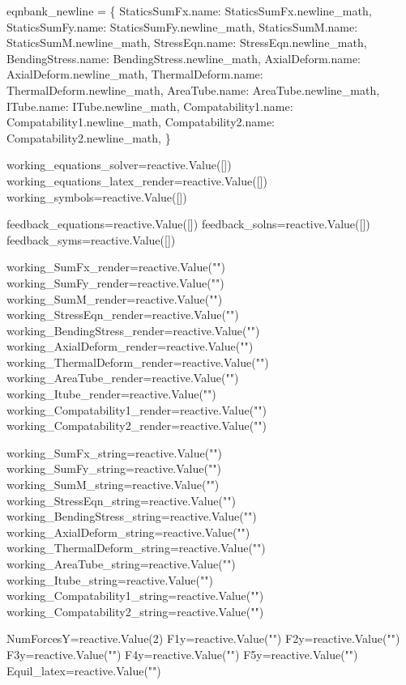 \documentclass[
  letterpaper,
  DIV=11,
  numbers=noendperiod]{scrreprt}
\newenvironment{Shaded}{\begin{snugshade}}{\end{snugshade}}
\newcommand{\NormalTok}[1]{\textcolor[rgb]{0.00,0.23,0.31}{#1}}
\begin{document}
\begin{Shaded}
\begin{Highlighting}[]
\NormalTok{eqnbank\_newline = \{}
\NormalTok{    StaticsSumFx.name: StaticsSumFx.newline\_math,}
\NormalTok{    StaticsSumFy.name: StaticsSumFy.newline\_math,}
\NormalTok{    StaticsSumM.name: StaticsSumM.newline\_math,}
\NormalTok{    StressEqn.name: StressEqn.newline\_math,}
\NormalTok{    BendingStress.name: BendingStress.newline\_math,}
\NormalTok{    AxialDeform.name: AxialDeform.newline\_math,}
\NormalTok{    ThermalDeform.name: ThermalDeform.newline\_math,}
\NormalTok{    AreaTube.name: AreaTube.newline\_math,}
\NormalTok{    ITube.name: ITube.newline\_math,}
\NormalTok{    Compatability1.name: Compatability1.newline\_math,}
\NormalTok{    Compatability2.name: Compatability2.newline\_math,}
\NormalTok{\}}



\NormalTok{working\_equations\_solver=reactive.Value([])}
\NormalTok{working\_equations\_latex\_render=reactive.Value([])}
\NormalTok{working\_symbols=reactive.Value([])}

\NormalTok{feedback\_equations=reactive.Value([])}
\NormalTok{feedback\_solns=reactive.Value([])}
\NormalTok{feedback\_syms=reactive.Value([])}

\NormalTok{working\_SumFx\_render=reactive.Value("")}
\NormalTok{working\_SumFy\_render=reactive.Value("")}
\NormalTok{working\_SumM\_render=reactive.Value("")}
\NormalTok{working\_StressEqn\_render=reactive.Value("")}
\NormalTok{working\_BendingStress\_render=reactive.Value("")}
\NormalTok{working\_AxialDeform\_render=reactive.Value("")}
\NormalTok{working\_ThermalDeform\_render=reactive.Value("")}
\NormalTok{working\_AreaTube\_render=reactive.Value("")}
\NormalTok{working\_Itube\_render=reactive.Value("")}
\NormalTok{working\_Compatability1\_render=reactive.Value("")}
\NormalTok{working\_Compatability2\_render=reactive.Value("")}

\NormalTok{working\_SumFx\_string=reactive.Value("")}
\NormalTok{working\_SumFy\_string=reactive.Value("")}
\NormalTok{working\_SumM\_string=reactive.Value("")}
\NormalTok{working\_StressEqn\_string=reactive.Value("")}
\NormalTok{working\_BendingStress\_string=reactive.Value("")}
\NormalTok{working\_AxialDeform\_string=reactive.Value("")}
\NormalTok{working\_ThermalDeform\_string=reactive.Value("")}
\NormalTok{working\_AreaTube\_string=reactive.Value("")}
\NormalTok{working\_Itube\_string=reactive.Value("")}
\NormalTok{working\_Compatability1\_string=reactive.Value("")}
\NormalTok{working\_Compatability2\_string=reactive.Value("")}

\NormalTok{NumForcesY=reactive.Value(2)}
\NormalTok{F1y=reactive.Value("")}
\NormalTok{F2y=reactive.Value("")}
\NormalTok{F3y=reactive.Value("")}
\NormalTok{F4y=reactive.Value("")}
\NormalTok{F5y=reactive.Value("")}
\NormalTok{Equil\_latex=reactive.Value("")}


\end{Highlighting}
\end{Shaded}
\end{document}
